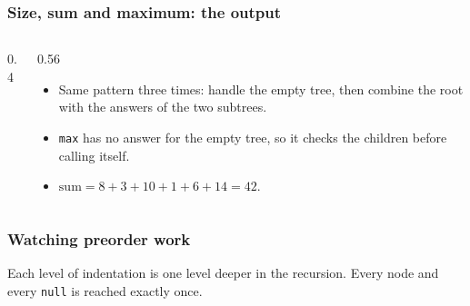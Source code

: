 \documentclass[aspectratio=169,10pt,compress]{beamer}
\begin{document}
\begin{frame}[t,fragile] \frametitle{Size, sum and maximum: the output}
  \begin{columns}[T]
    \begin{column}{0.4\textwidth}
    \end{column}
    \begin{column}{0.56\textwidth}
      \begin{itemize}\small
        \item Same pattern three times: handle the empty tree, then combine the root with the answers of the two subtrees.
        \item \texttt{max} has no answer for the empty tree, so it checks the children before calling itself.
        \item $\mathrm{sum} = 8 + 3 + 10 + 1 + 6 + 14 = 42$.
      \end{itemize}
    \end{column}
  \end{columns}
\end{frame}





\begin{frame}[t,fragile] \frametitle{Watching preorder work}

  \vspace{0.2em}
  \small Each level of indentation is one level deeper in the recursion. Every node and every \texttt{null} is reached exactly once.
\end{frame}
\end{document}
